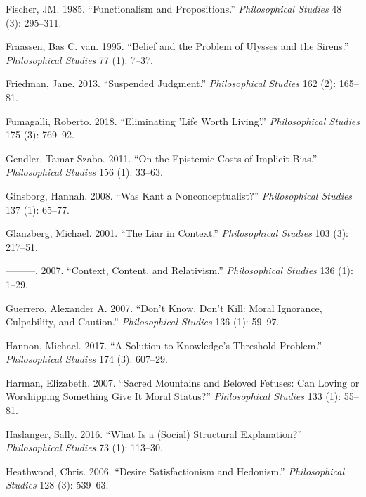 \documentclass[
  10pt,
  letterpaper,
  DIV=11,
  numbers=noendperiod,
  twoside]{scrartcl}
\newlength{\cslhangindent}
\newenvironment{CSLReferences}[2] %
 {\begin{list}{}{%
  \setlength{\itemindent}{0pt}
  \setlength{\leftmargin}{0pt}
  \setlength{\parsep}{0pt}
  \ifodd #1
   \setlength{\leftmargin}{\cslhangindent}
   \setlength{\itemindent}{-1\cslhangindent}
  \fi
  \setlength{\itemsep}{#2\baselineskip}}}
 {\end{list}}
\begin{document}
\begin{CSLReferences}{1}{0}
Fischer, JM. 1985. {``Functionalism and Propositions.''}
\emph{Philosophical Studies} 48 (3): 295--311.

Fraassen, Bas C. van. 1995. {``Belief and the Problem of Ulysses and the
Sirens.''} \emph{Philosophical Studies} 77 (1): 7--37.

Friedman, Jane. 2013. {``Suspended Judgment.''} \emph{Philosophical
Studies} 162 (2): 165--81.

Fumagalli, Roberto. 2018. {``Eliminating 'Life Worth Living'.''}
\emph{Philosophical Studies} 175 (3): 769--92.

Gendler, Tamar Szabo. 2011. {``On the Epistemic Costs of Implicit
Bias.''} \emph{Philosophical Studies} 156 (1): 33--63.

Ginsborg, Hannah. 2008. {``Was Kant a Nonconceptualist?''}
\emph{Philosophical Studies} 137 (1): 65--77.

Glanzberg, Michael. 2001. {``The Liar in Context.''} \emph{Philosophical
Studies} 103 (3): 217--51.

---------. 2007. {``Context, Content, and Relativism.''}
\emph{Philosophical Studies} 136 (1): 1--29.

Guerrero, Alexander A. 2007. {``Don't Know, Don't Kill: Moral Ignorance,
Culpability, and Caution.''} \emph{Philosophical Studies} 136 (1):
59--97.

Hannon, Michael. 2017. {``A Solution to Knowledge's Threshold
Problem.''} \emph{Philosophical Studies} 174 (3): 607--29.

Harman, Elizabeth. 2007. {``Sacred Mountains and Beloved Fetuses: Can
Loving or Worshipping Something Give It Moral Status?''}
\emph{Philosophical Studies} 133 (1): 55--81.

Haslanger, Sally. 2016. {``What Is a (Social) Structural Explanation?''}
\emph{Philosophical Studies} 73 (1): 113--30.

Heathwood, Chris. 2006. {``Desire Satisfactionism and Hedonism.''}
\emph{Philosophical Studies} 128 (3): 539--63.


\end{CSLReferences}
\end{document}
